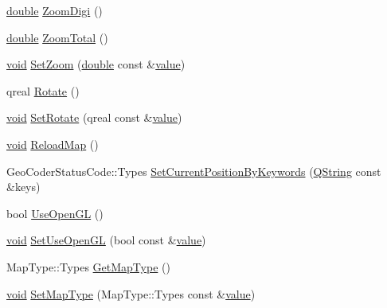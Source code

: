 \begin{DoxyCompactItemize}
\item 
\hyperlink{_super_l_u_support_8h_a8956b2b9f49bf918deed98379d159ca7}{double} \hyperlink{group___o_p_map_widget_gaf7a725070972e7158ec0f5b10a0d9cd3}{Zoom\-Digi} ()
\item 
\hyperlink{_super_l_u_support_8h_a8956b2b9f49bf918deed98379d159ca7}{double} \hyperlink{group___o_p_map_widget_ga2060cbfea71913a458f3a6f0c6dad8c5}{Zoom\-Total} ()
\item 
\hyperlink{group___u_a_v_objects_plugin_ga444cf2ff3f0ecbe028adce838d373f5c}{void} \hyperlink{group___o_p_map_widget_ga63fe346f4ea58f09453ccd42ffe87260}{Set\-Zoom} (\hyperlink{_super_l_u_support_8h_a8956b2b9f49bf918deed98379d159ca7}{double} const \&\hyperlink{glext_8h_aa0e2e9cea7f208d28acda0480144beb0}{value})
\item 
qreal \hyperlink{group___o_p_map_widget_gaea05eeafa50a244b2356918c2dae0444}{Rotate} ()
\item 
\hyperlink{group___u_a_v_objects_plugin_ga444cf2ff3f0ecbe028adce838d373f5c}{void} \hyperlink{group___o_p_map_widget_ga1e6312bc140cbcfa38ac1bd66b278a71}{Set\-Rotate} (qreal const \&\hyperlink{glext_8h_aa0e2e9cea7f208d28acda0480144beb0}{value})
\item 
\hyperlink{group___u_a_v_objects_plugin_ga444cf2ff3f0ecbe028adce838d373f5c}{void} \hyperlink{group___o_p_map_widget_ga5281e4aae5ac664f9d4093735e6ced51}{Reload\-Map} ()
\item 
Geo\-Coder\-Status\-Code\-::\-Types \hyperlink{group___o_p_map_widget_ga6dfd41d966be5940e4bb94dd36a25499}{Set\-Current\-Position\-By\-Keywords} (\hyperlink{group___u_a_v_objects_plugin_gab9d252f49c333c94a72f97ce3105a32d}{Q\-String} const \&keys)
\item 
bool \hyperlink{group___o_p_map_widget_gafe684fbd6e3d76b2dbb9eeb2ffeab969}{Use\-Open\-G\-L} ()
\item 
\hyperlink{group___u_a_v_objects_plugin_ga444cf2ff3f0ecbe028adce838d373f5c}{void} \hyperlink{group___o_p_map_widget_ga1dad00a9a3dc508690c7db4cb7b3373d}{Set\-Use\-Open\-G\-L} (bool const \&\hyperlink{glext_8h_aa0e2e9cea7f208d28acda0480144beb0}{value})
\item 
Map\-Type\-::\-Types \hyperlink{group___o_p_map_widget_gaf5f079175bace819bcc168c5ea4bdb59}{Get\-Map\-Type} ()
\item 
\hyperlink{group___u_a_v_objects_plugin_ga444cf2ff3f0ecbe028adce838d373f5c}{void} \hyperlink{group___o_p_map_widget_ga57d623773f3801edb2a359b9d92c648b}{Set\-Map\-Type} (Map\-Type\-::\-Types const \&\hyperlink{glext_8h_aa0e2e9cea7f208d28acda0480144beb0}{value})

\end{DoxyCompactItemize}
